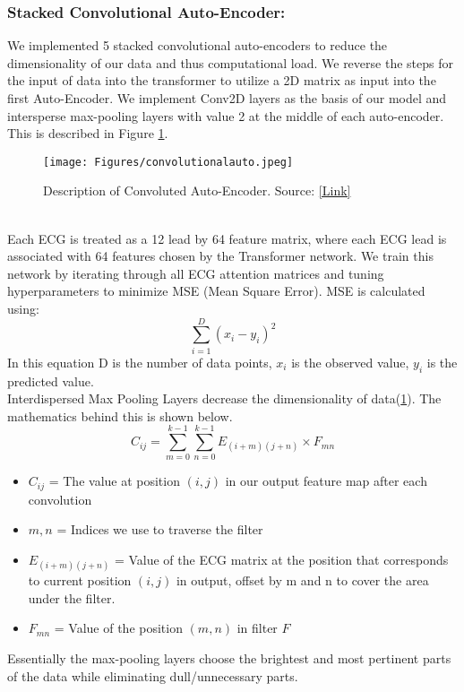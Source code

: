 \documentclass[
	a4paper, 
	10pt, 
	twoside, 
]{LTJournalArticle}
\begin{document}
\subsubsection{Stacked Convolutional Auto-Encoder: } We implemented 5 stacked convolutional auto-encoders to reduce the dimensionality of our data and thus computational load. We reverse the steps for the input of data into the transformer to utilize a 2D matrix as input into the first Auto-Encoder. We implement Conv2D layers as the basis of our model and intersperse max-pooling layers with value 2 at the middle of each auto-encoder. This is described in Figure \ref{fig:convoauto}. 
\begin{figure}[!h]
    \centering
    \texttt{[image: Figures/convolutionalauto.jpeg]}
    \caption{Description of Convoluted Auto-Encoder. Source: \href{https://www.frontiersin.org/articles/10.3389/frai.2022.640926/full}{[Link]}}
    \label{fig:convoauto}
\end{figure}
\\
Each ECG is treated as a 12 lead by 64 feature matrix, where each ECG lead is associated with 64 features chosen by the Transformer network. We train this network by iterating through all ECG attention matrices and tuning hyperparameters to minimize MSE (Mean Square Error). MSE is calculated using:
\begin{equation}
    \sum_{i=1}^{D}(x_i-y_i)^2
\end{equation}
In this equation D is the number of data points, $x_i$ is the observed value, $y_i$ is the predicted value. 
\\
Interdispersed Max Pooling Layers decrease the dimensionality of data(\ref{fig:convoauto}). The mathematics behind this is shown below. 
\begin{equation}
    C_{ij} = \sum_{m=0}^{k-1} \sum_{n=0}^{k-1} E_{(i+m)(j+n)} \times F_{mn}
\end{equation}
\begin{itemize}
    \item $C_{ij}$ = The value at position $(i,j)$ in our output feature map after each convolution
    \item $m,n$ = Indices we use to traverse the filter
    \item $E_{(i+m)(j+n)}$ = Value of the ECG matrix at the position that corresponds to current position $(i,j)$ in output, offset by m and n to cover the area under the filter. 
    \item $F_{mn}$ = Value of the position $(m,n)$ in filter $F$
\end{itemize}
Essentially the max-pooling layers choose the brightest and most pertinent parts of the data while eliminating dull/unnecessary parts. 
\end{document}
